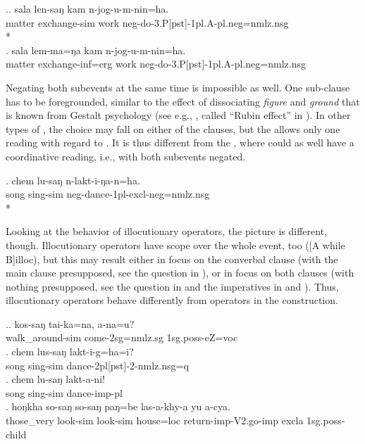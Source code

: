 \ex.\ag.	sala len-saŋ kam n-jog-u-m-nin=ha.\\
			matter exchange-{\sc sim} work {\sc neg-}do{\sc -3.P[pst]-1pl.A-pl.neg=nmlz.nsg}\\
			*\\
	\bg.	sala lem-ma=ŋa kam n-jog-u-m-nin=ha.\\
			matter exchange{\sc -inf=erg} work {\sc neg-}do{\sc -3.P[pst]-1pl.A-pl.neg=nmlz.nsg}\\
		
Negating both subevents at the same time is impossible as well. One sub-clause has to be foregrounded, similar to the effect of dissociating \emph{figure} and \emph{ground} that is known from Gestalt psychology (see e.g., \citet{Jackendoff1983Semantics}, called “Rubin effect” in \citealt[48]{Bickel1991Typologische}). In other types of , the choice may fall on either of the clauses, but the  allows only one reading with regard to . It is thus different from the , where  could as well have a coordinative reading, i.e., with both subevents negated.

\exg.	chem lu-saŋ n-lakt-i-ŋa-n=ha.\\
		song sing-{\sc sim} {\sc neg-}dance{\sc -1pl-excl-neg=nmlz.nsg}\\
		*\\
		
		
Looking at the behavior of illocutionary operators, the picture is different, though. Illocutionary operators have scope over the whole event, too ([A while B]{\sc illoc}), but this may result either in focus on the converbal clause (with the main clause presupposed, see the question in \Next[a]), or in focus on both clauses (with nothing presupposed, see the question in \Next[b] and the imperatives in \Next[c] and \Next[d]). Thus, illocutionary operators behave differently from  operators in the  construction. 

\ex.\ag.	kos-saŋ tai-ka=na, a-na=u?\\
		walk\_around{\sc -sim} come{\sc [npst]-2sg=nmlz.sg} {\sc 1sg.poss-}eZ={\sc voc}\\
		  
\bg.	chem lus-saŋ lakt-i-g=ha=i?\\
		song   sing-{\sc sim} dance{\sc -2pl[pst]-2-nmlz.nsg=q}\\
\bg.	chem lu-saŋ lakt-a-ni!\\
		song   sing-{\sc sim} dance{\sc -imp-pl}\\
\bg. hoŋkha so-saŋ   so-saŋ   paŋ=be   las-a-khy-a     yu    a-cya.\\
 those\_very look{\sc -sim} look{\sc -sim} house{\sc =loc} return{\sc -imp-V2.go-imp}  {\sc excla}   {\sc 1sg.poss-}child\\
  

